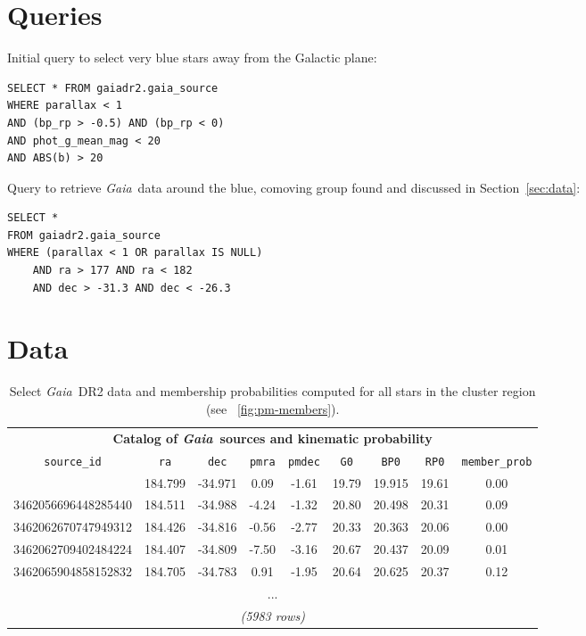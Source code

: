 \documentclass[twocolumn]{aastex62}
\newcommand{\acronym}[1]{{\small{#1}}}
\newcommand{\gaia}{\textsl{Gaia}}
\newcommand{\DR}[1]{\acronym{DR#1}}
\newcommand{\sectionname}{Section}
\begin{document}
\clearpage

\appendix

\section{Queries}
\label{sec:queries}

Initial query to select very blue stars away from the Galactic plane:
\begin{verbatim}
SELECT * FROM gaiadr2.gaia_source
WHERE parallax < 1
AND (bp_rp > -0.5) AND (bp_rp < 0)
AND phot_g_mean_mag < 20
AND ABS(b) > 20
\end{verbatim}

Query to retrieve \gaia\ data around the blue, comoving group found and discussed in \sectionname~\ref{sec:data}:
\begin{verbatim}
SELECT *
FROM gaiadr2.gaia_source
WHERE (parallax < 1 OR parallax IS NULL)
    AND ra > 177 AND ra < 182
    AND dec > -31.3 AND dec < -26.3
\end{verbatim}

\section{Data}
\label{sec:datatables}

\begin{table}[h!]
    \centering
    \begin{tabular}{c | c | c | c | c | c | c | c | c}
        \multicolumn{9}{c}{\textbf{Catalog of \gaia\ sources and kinematic probability}}\\
        \texttt{source\_id} & \texttt{ra} & \texttt{dec} & \texttt{pmra} & \texttt{pmdec} & \texttt{G0} & \texttt{BP0} & \texttt{RP0} & \texttt{member\_prob} \\
        \tableline
        3462048793708019200 & 184.799 & -34.971 &  0.09 & -1.61 & 19.79 & 19.915 & 19.61 & 0.00 \\
        3462056696448285440 & 184.511 & -34.988 & -4.24 & -1.32 & 20.80 & 20.498 & 20.31 & 0.09 \\
        3462062670747949312 & 184.426 & -34.816 & -0.56 & -2.77 & 20.33 & 20.363 & 20.06 & 0.00 \\
        3462062709402484224 & 184.407 & -34.809 & -7.50 & -3.16 & 20.67 & 20.437 & 20.09 & 0.01 \\
        3462065904858152832 & 184.705 & -34.783 &  0.91 & -1.95 & 20.64 & 20.625 & 20.37 & 0.12 \\
        \multicolumn{9}{c}{...}\\
        \multicolumn{9}{c}{\textit{(5983 rows)}}
    \end{tabular}
    \caption{Select \gaia\ \DR{2} data and membership probabilities computed for all stars in the cluster region (see \figurename~\ref{fig:pm-members}).}
    \label{tbl:gaiadata}
\end{table}
\end{document}
